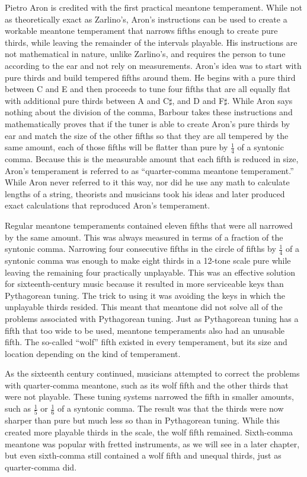 Pietro Aron is credited with the first practical meantone temperament.  While not as
theoretically exact as Zarlino's, Aron's instructions can be used to create a workable
meantone temperament that narrows fifths enough to create pure thirds, while leaving the
remainder of the intervals playable.  His instructions are not mathematical in nature,
unlike Zarlino's, and requires the person to tune according to the ear and not rely on
measurements.  Aron's idea was to start with pure thirds and build tempered fifths around
them.  He begins with a pure third between C and E and then proceeds to tune four fifths
that are all equally flat with additional pure thirds between A and C$\sharp$, and D and
F$\sharp$.  While Aron says nothing about the division of the comma, Barbour takes these
instructions and mathematically proves that if the tuner is able to create Aron's pure
thirds by ear and match the size of the other fifths so that they are all tempered by the
same amount, each of those fifths will be flatter than pure by $ \frac{1}{4} $ of a
syntonic comma.\autocite[27]{MB:1}  Because this is the measurable amount that each fifth
is reduced in size, Aron's temperament is referred to as ``quarter-comma meantone
temperament.'' While Aron never referred to it this way, nor did he use any math to
calculate lengths of a string, theorists and musicians took his ideas and later produced
exact calculations that reproduced Aron's temperament.

Regular meantone temperaments contained eleven fifths that were all narrowed by the same
amount. This was always measured in terms of a fraction of the syntonic comma. Narrowing
four consecutive fifths in the circle of fifths by $ \frac{1}{4} $ of a syntonic comma was
enough to make eight thirds in a 12-tone scale pure while leaving the remaining four
practically unplayable.\autocite[33]{RD:1}  This was an effective solution for
sixteenth-century music because it resulted in more serviceable keys than Pythagorean
tuning.  The trick to using it was avoiding the keys in which the unplayable thirds
resided.  This meant that meantone did not solve all of the problems associated with
Pythagorean tuning.  Just as Pythagorean tuning has a fifth that too wide to be used,
meantone temperaments also had an unusable fifth.  The so-called ``wolf'' fifth existed in
every temperament, but its size and location depending on the kind of temperament.

As the sixteenth century continued, musicians attempted to correct the problems with
quarter-comma meantone, such as its wolf fifth and the other thirds that were not
playable. These tuning systems narrowed the fifth in smaller amounts, such as $
\frac{1}{5} $ or $ \frac{1}{6} $ of a syntonic comma. The result was that the thirds were
now sharper than pure but much less so than in Pythagorean tuning.  While this created
more playable thirds in the scale, the wolf fifth remained.  Sixth-comma meantone was
popular with fretted instruments, as we will see in a later chapter, but even sixth-comma
still contained a wolf fifth and unequal thirds, just as quarter-comma did.

